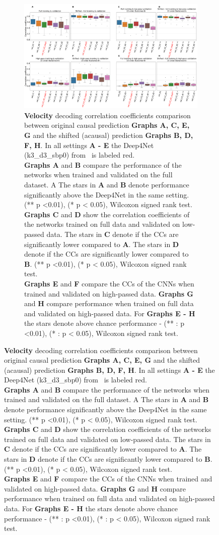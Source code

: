 \begin{figure}[!htpb]
\centering
\begin{subfigure}[t]{\textwidth}
   \includegraphics[width=1\linewidth]{img/ch4/original_vs_shifted_vel_performance_comparison.pdf}
   \caption[Velocity: non-shifted vs. shifted setting performances]{\textbf{Velocity} decoding correlation coefficients comparison between original causal prediction \textbf{Graphs A, C, E, G} and the shifted (acausal) prediction \textbf{Graphs B, D, F, H}. In all settings \textbf{
   A - E} the Deep4Net (k3\_d3\_sbp0) from~\cite{Hammer-2021} is labeled red.\\ \textbf{Graphs A} and \textbf{B} compare the performance of the networks when trained and validated on the full dataset. A The stars in \textbf{A} and \textbf{B} denote performance significantly above the Deep4Net in the same setting. (** p <0.01), (* p < 0.05), Wilcoxon signed rank test.
   \\\textbf{Graphs C} and \textbf{D} show the correlation coefficients of the networks trained on full data and validated on low-passed data. 
   The stars in \textbf{C} denote if the CCs are significantly lower compared to \textbf{A}. The stars in \textbf{D} denote if the CCs are significantly lower compared to \textbf{B}. (** p <0.01), (* p < 0.05), Wilcoxon signed rank test.
   \\\textbf{Graphs E} and \textbf{F} compare the CCs of the CNNs when trained and validated on high-passed data. \textbf{Graphs G} and \textbf{H} compare performance when trained on full data and validated on high-passed data. For \textbf{Graphs E - H} the stars denote above chance performance - (** : p <0.01), (* : p < 0.05), Wilcoxon signed rank test.}
   \label{fig:shifted-performance-vel}
\end{subfigure}
\end{figure}
\clearpage   

